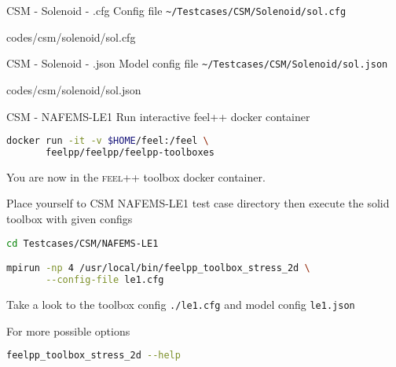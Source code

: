 \begin{frame}{CSM - Solenoid - .cfg}
Config file \lstinline{~/Testcases/CSM/Solenoid/sol.cfg}
\vspace{5mm}

{codes/csm/solenoid/sol.cfg}
\framebreak
\end{frame}



\begin{frame}{CSM - Solenoid - .json}
Model config file \lstinline{~/Testcases/CSM/Solenoid/sol.json}
\vspace{5mm}
    
{codes/csm/solenoid/sol.json}
\framebreak
\end{frame}







\begin{frame}{CSM - NAFEMS-LE1}
Run  interactive feel++ docker container

\begin{lstlisting}[language=Bash,mathescape=false,emph={docker}]
docker run -it -v $HOME/feel:/feel \
       feelpp/feelpp/feelpp-toolboxes
\end{lstlisting}

You are now in the \textsc{feel++} toolbox docker container.

Place yourself to CSM NAFEMS-LE1 test case directory then execute the
solid toolbox with given configs

\begin{lstlisting}[language=Bash,mathescape=false, emph={feelpp_toolbox_stress_2d}]
cd Testcases/CSM/NAFEMS-LE1

mpirun -np 4 /usr/local/bin/feelpp_toolbox_stress_2d \
       --config-file le1.cfg
\end{lstlisting}

Take a look to the toolbox config \lstinline{./le1.cfg} and model config
\lstinline{le1.json}

For more possible options
\begin{lstlisting}[language=Bash,mathescape=false, emph={feelpp_toolbox_stress_2d}]
feelpp_toolbox_stress_2d --help
\end{lstlisting}

\end{frame}

